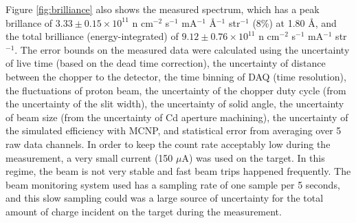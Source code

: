 \documentclass[5p,12pt]{elsarticle}
\begin{document}
Figure \ref{fig:brilliance} also shows the measured spectrum, which has a peak brillance of $3.33 \pm 0.15\times10^{11}$ n cm$^{-2}$ s$^{-1}$ mA$^{-1}$ \AA$^{-1}$ str$^{-1}$ (8\%) at 1.80 {\AA}, and the total brilliance (energy-integrated) of $9.12 \pm 0.76\times10^{11}$ n cm$^{-2}$ s$^{-1}$ mA$^{-1}$ str$^{-1}$.  The error bounds on the measured data were calculated using the uncertainty of live time (based on the dead time correction), the uncertainty of distance between the chopper to the detector, the time binning of DAQ (time resolution), the fluctuations of proton beam, the uncertainty of the chopper duty cycle (from the uncertainty of the slit width), the uncertainty of solid angle, the uncertainty of beam size (from the uncertainty of Cd aperture machining), the uncertainty of the simulated efficiency with MCNP, and statistical error from averaging over 5 raw data channels.  In order to keep the count rate acceptably low during the measurement, a very small current (150 $\mu$A) was used on the target.  In this regime, the beam is not very stable and fast beam trips happened frequently.  The beam monitoring system used has a sampling rate of one sample per 5 seconds, and this slow sampling could was a large source of uncertainty for the total amount of charge incident on the target during the measurement.

\end{document}
